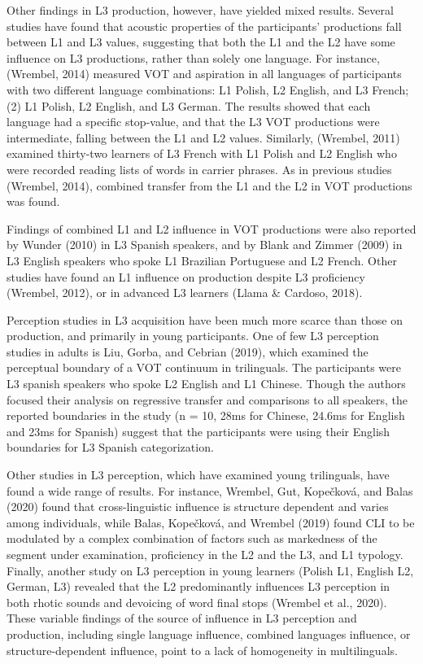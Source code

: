 \documentclass[
  man]{apa6}
\begin{document}
Other findings in L3 production, however, have yielded mixed results.
Several studies have found that acoustic properties of the participants' productions fall between L1 and L3 values, suggesting that both the L1 and the L2 have some influence on L3 productions, rather than solely one language.
For instance, (Wrembel, 2014) measured VOT and aspiration in all languages of participants with two different language combinations: L1 Polish, L2 English, and L3 French; (2) L1 Polish, L2 English, and L3 German.
The results showed that each language had a specific stop-value, and that the L3 VOT productions were intermediate, falling between the L1 and L2 values.
Similarly, (Wrembel, 2011) examined thirty-two learners of L3 French with L1 Polish and L2 English who were recorded reading lists of words in carrier phrases.
As in previous studies (Wrembel, 2014), combined transfer from the L1 and the L2 in VOT productions was found.

Findings of combined L1 and L2 influence in VOT productions were also reported by Wunder (2010) in L3 Spanish speakers, and by Blank and Zimmer (2009) in L3 English speakers who spoke L1 Brazilian Portuguese and L2 French.
Other studies have found an L1 influence on production despite L3 proficiency (Wrembel, 2012), or in advanced L3 learners (Llama \& Cardoso, 2018).

Perception studies in L3 acquisition have been much more scarce than those on production, and primarily in young participants.
One of few L3 perception studies in adults is Liu, Gorba, and Cebrian (2019), which examined the perceptual boundary of a VOT continuum in trilinguals.
The participants were L3 spanish speakers who spoke L2 English and L1 Chinese.
Though the authors focused their analysis on regressive transfer and comparisons to all speakers, the reported boundaries in the study (n = 10, 28ms for Chinese, 24.6ms for English and 23ms for Spanish) suggest that the participants were using their English boundaries for L3 Spanish categorization.

Other studies in L3 perception, which have examined young trilinguals, have found a wide range of results.
For instance, Wrembel, Gut, Kopečková, and Balas (2020) found that cross-linguistic influence is structure dependent and varies among individuals, while Balas, Kopečková, and Wrembel (2019) found CLI to be modulated by a complex combination of factors such as markedness of the segment under examination, proficiency in the L2 and the L3, and L1 typology.
Finally, another study on L3 perception in young learners (Polish L1, English L2, German, L3) revealed that the L2 predominantly influences L3 perception in both rhotic sounds and devoicing of word final stops (Wrembel et al., 2020). These variable findings of the source of influence in L3 perception and production, including single language influence, combined languages influence, or structure-dependent influence, point to a lack of homogeneity in multilinguals.
\end{document}
